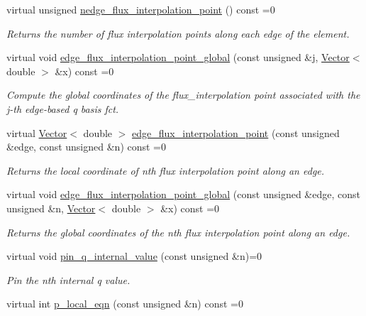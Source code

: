 \begin{DoxyCompactItemize}
virtual unsigned \hyperlink{classoomph_1_1DarcyEquations_a4e09bc2cc0d08dc6dd43580c2a45d5c4}{nedge\+\_\+flux\+\_\+interpolation\+\_\+point} () const =0
\begin{DoxyCompactList}\small\item\em Returns the number of flux interpolation points along each edge of the element. \end{DoxyCompactList}\item 
virtual void \hyperlink{classoomph_1_1DarcyEquations_a250719cbe94e97c88996b5b4f5553649}{edge\+\_\+flux\+\_\+interpolation\+\_\+point\+\_\+global} (const unsigned \&j, \hyperlink{classoomph_1_1Vector}{Vector}$<$ double $>$ \&x) const =0
\begin{DoxyCompactList}\small\item\em Compute the global coordinates of the flux\+\_\+interpolation point associated with the j-\/th edge-\/based q basis fct. \end{DoxyCompactList}\item 
virtual \hyperlink{classoomph_1_1Vector}{Vector}$<$ double $>$ \hyperlink{classoomph_1_1DarcyEquations_aebfe04cc9fedf1ba024b4db2b1d44de5}{edge\+\_\+flux\+\_\+interpolation\+\_\+point} (const unsigned \&edge, const unsigned \&n) const =0
\begin{DoxyCompactList}\small\item\em Returns the local coordinate of nth flux interpolation point along an edge. \end{DoxyCompactList}\item 
virtual void \hyperlink{classoomph_1_1DarcyEquations_a46a2b8488be8bb249852b4771b25c30a}{edge\+\_\+flux\+\_\+interpolation\+\_\+point\+\_\+global} (const unsigned \&edge, const unsigned \&n, \hyperlink{classoomph_1_1Vector}{Vector}$<$ double $>$ \&x) const =0
\begin{DoxyCompactList}\small\item\em Returns the global coordinates of the nth flux interpolation point along an edge. \end{DoxyCompactList}\item 
virtual void \hyperlink{classoomph_1_1DarcyEquations_a7731ceb6bd31bfd6cc6c8fa1ee369779}{pin\+\_\+q\+\_\+internal\+\_\+value} (const unsigned \&n)=0
\begin{DoxyCompactList}\small\item\em Pin the nth internal q value. \end{DoxyCompactList}\item 
virtual int \hyperlink{classoomph_1_1DarcyEquations_a3eee8ba9fd2256d01c4be1141a5d6eb1}{p\+\_\+local\+\_\+eqn} (const unsigned \&n) const =0

\end{DoxyCompactItemize}
